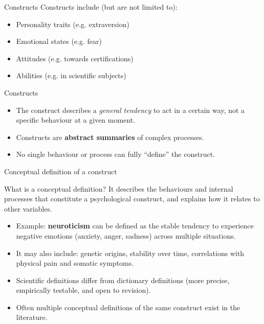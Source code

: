 \documentclass{beamer}
\begin{document}
\begin{frame}{Constructs}
Constructs include (but are not limited to):
    \begin{itemize}
      \item Personality traits (e.g. extraversion)
      \item Emotional states (e.g. fear)
      \item Attitudes (e.g. towards certifications)
      \item Abilities (e.g. in scientific subjects)
    \end{itemize}
\end{frame}

\begin{frame}{Constructs}
  \begin{itemize}
    \item The construct describes a \textit{general tendency} to act in a certain way, not a specific behaviour at a given moment.
    \item Constructs are \textbf{abstract summaries} of complex processes.
    \item No single behaviour or process can fully ``define'' the construct.
  \end{itemize}
\end{frame}

\begin{frame}{Conceptual definition of a construct}
  \begin{block}{What is a conceptual definition?}
    It describes the behaviours and internal processes that constitute a psychological construct, and explains how it relates to other variables.
  \end{block}
  \pause
  \begin{itemize}
    \item Example: \textbf{neuroticism} can be defined as the stable tendency to experience negative emotions (anxiety, anger, sadness) across multiple situations.
    \item It may also include: genetic origins, stability over time, correlations with physical pain and somatic symptoms.
    \pause
    \item Scientific definitions differ from dictionary definitions (more precise, empirically testable, and open to revision).
    \item Often multiple conceptual definitions of the same construct exist in the literature.
  \end{itemize}
\end{frame}
\end{document}
